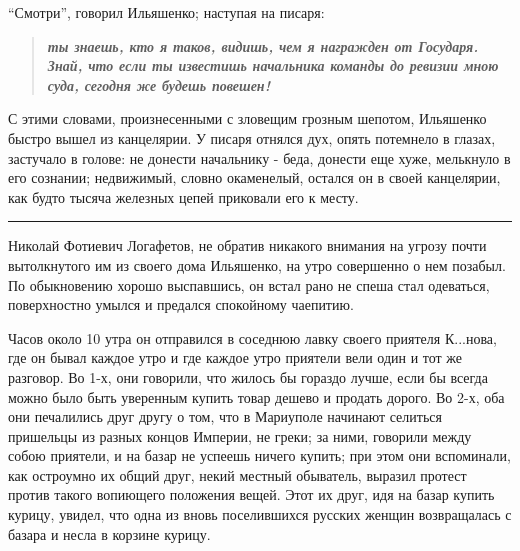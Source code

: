 \documentclass[a4paper,20pt]{article}
\begin{document}
``Смотри'', говорил Ильяшенко; наступая на писаря:
\begin{quote}
\em\bfseries	
ты знаешь, кто я таков, видишь, чем я награжден от
Государя. Знай, что если ты известишь начальника команды до ревизии мною суда,
сегодня же будешь повешен!
\end{quote}

С этими словами, произнесенными с зловещим грозным шепотом, Ильяшенко быстро
вышел из канцелярии.  У писаря отнялся дух, опять потемнело в глазах, застучало
в голове: не донести начальнику - беда, донести еще хуже, мелькнуло в его
сознании; недвижимый, словно окаменелый, остался он в своей канцелярии, как
будто тысяча железных цепей приковали его к месту.

\par\noindent\rule{\textwidth}{0.4pt}

Николай Фотиевич Логафетов, не обратив никакого внимания на угрозу почти
вытолкнутого им из своего дома Ильяшенко, на утро совершенно о нем позабыл. 
По обыкновению хорошо выспавшись, он встал рано не спеша стал одеваться, поверхностно 
умылся и предался спокойному чаепитию.

Часов около 10 утра он отправился в соседнюю лавку своего приятеля К...нова, где он бывал каждое утро
и где каждое утро приятели вели один и тот же разговор.
Во 1-х, они говорили, что жилось бы гораздо лучше, если
бы всегда можно было быть уверенным купить товар дешево и продать дорого. Во
2-х, оба они печалились друг другу о том, что в Мариуполе начинают селиться пришельцы из разных концов Империи, не греки;
за ними, говорили между собою приятели, и на базар не успеешь ничего купить;
при этом они вспоминали, как остроумно их общий друг, некий местный обыватель, выразил протест 
против такого вопиющего положения вещей. Этот их
друг, идя на базар купить курицу, увидел, что одна из
вновь поселившихся русских женщин возвращалась с базара и несла в корзине курицу. 
\end{document}
